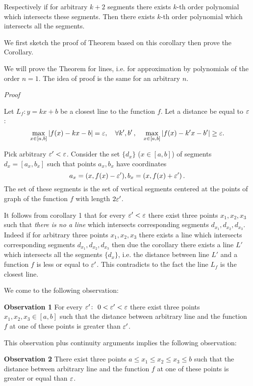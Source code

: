 {Respectively if for arbitrary $k+2$ segments there 
exists $k$-th order polynomial   which intersects these segments.
Then there exists $k$-th order polynomial  which 
intersects all the segments.

 We first sketch the proof of Theorem based on this corollary
then prove the Corollary.

  We will prove the Theorem for lines,
i.e. for approximation by polynomials of the order $n=1$. 
The idea of proof is the same for
an arbitrary $n$.

{\sl Proof}




 Let $L_f\colon y=kx+b$ be a closest line to the function $f$.
Let a distance be equal to ${\varepsilon}$:
                       $$
   \max_{x\in [a,b]}|f(x)-kx-b|={\varepsilon},\quad
\forall k',b'\,,\quad
\max_{x\in [a,b]}|f(x)-k'x-b'|\geq {\varepsilon}. 
                    $$





Pick arbitrary ${\varepsilon}'<{\varepsilon}$. Consider the set
$\{d_x\}$ ($x\in [a,b]$)
of segments $d_x=[a_x,b_x]$ such that points $a_x,b_x$
have coordinates
                $$
   a_x=(x,f(x)-{\varepsilon}'), b_x=(x,f(x)+{\varepsilon}')\,.
                $$ 
  The set of these segments is the set of vertical segments
centered at the points of graph of the function $f$
with length $2{\varepsilon}'$.

It follows from corollary 1 that for every ${\varepsilon}'<{\varepsilon}$
there exist three points $x_1,x_2,x_3$ such that 
{\it there is no a line}
which intersects corresponding segments $d_{x_1},d_{x_2}, d_{x_3}$.
Indeed if for arbitrary three points
$x_1,x_2,x_3$ there exists  a line
which intersects corresponding segments $d_{x_1},d_{x_2}, d_{x_3}$
then due the corollary there exists a line $L'$ 
which intersects  all the segments
$\{d_x\}$, i.e. the distance between line
$L'$ and a function $f$ is less or equal to ${\varepsilon}'$. This contradicts
to the fact the line $L_f$ is the closest line.

We come to the following observation:

{\bf Observation 1} For every ${\varepsilon}'\colon\,\,0<{\varepsilon}'<{\varepsilon}$
there exist three points $x_1,x_2,x_3\in [a,b]$ such that 
the distance between arbitrary line and the function $f$
at one of these points is greater than ${\varepsilon}'$.
             

This observation plus  continuity arguments implies the following 
observation:



{\bf Observation 2} There exist three points 
$a\leq x_1\leq x_2\leq x_3\leq b$ such that  
the distance between arbitrary line and the function $f$
at one of these points is greater or equal than ${\varepsilon}$.


}
